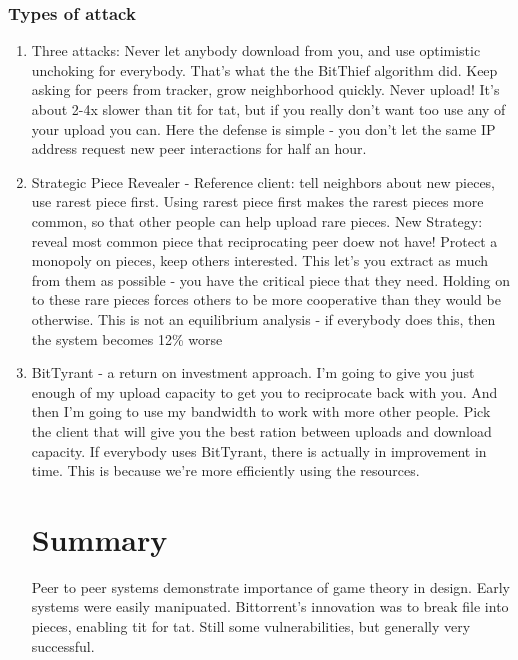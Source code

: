 \documentclass[12pt]{article}   	%
\begin{document}
\subsubsection{Types of attack}

\begin{enumerate}
\item Three attacks: Never let anybody download from you, and use optimistic unchoking for everybody. That's what the the BitThief algorithm did. Keep asking for peers from tracker, grow neighborhood quickly. Never upload! It's about 2-4x slower than tit for tat, but if you really don't want too use any of your upload you can. Here the defense is simple - you don't let the same IP address request new peer interactions for half an hour.
\item Strategic Piece Revealer - Reference client:  tell neighbors about new pieces, use rarest piece first. Using rarest piece first makes the rarest pieces more common, so that other people can help upload rare pieces.
New Strategy: reveal most common piece that reciprocating peer doew not have! Protect a monopoly on pieces, keep others interested. This let's you extract as much from them as possible - you have the critical piece that they need. Holding on to these rare pieces forces others to be more cooperative than they would be otherwise. This is not an equilibrium analysis - if everybody does this, then the system becomes 12\% worse
\item BitTyrant - a return on investment approach. I'm going to give you just enough of my upload capacity to get you to reciprocate back with you. And then I'm going to use my bandwidth to work with more other people. Pick the client that will give you the best ration between uploads and download capacity. If everybody uses BitTyrant, there is actually in improvement in time. This is because we're more efficiently using the resources. 

\section{Summary}
Peer to peer systems demonstrate importance of game theory in design. Early systems were easily manipuated. Bittorrent's innovation was to break file into pieces, enabling tit for tat. Still some vulnerabilities, but generally very successful.

\end{enumerate}
\end{document}
